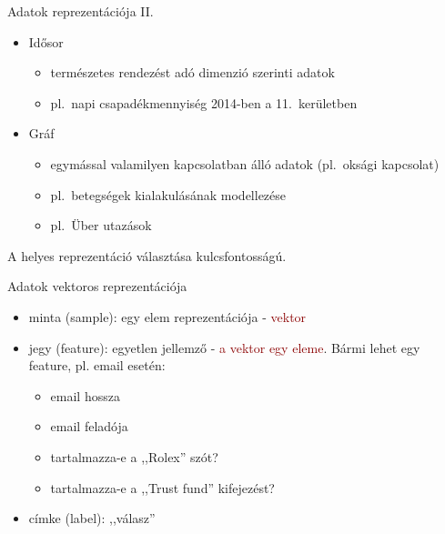 \documentclass[bigger]{beamer}
\begin{document}
\begin{frame}{Adatok reprezentációja II.}
    \begin{itemize}
        \item Idősor
            \begin{itemize}
                \item természetes rendezést adó dimenzió szerinti adatok
                \item pl.~napi csapadékmennyiség 2014-ben a 11.~kerületben
            \end{itemize}
        \item Gráf
            \begin{itemize}
                \item egymással valamilyen kapcsolatban álló adatok (pl.~oksági kapcsolat)
                \item pl.~betegségek kialakulásának modellezése
                \item pl.~Über utazások
            \end{itemize}
    \end{itemize}
    A helyes reprezentáció választása kulcsfontosságú.
\end{frame}

\begin{frame}{Adatok vektoros reprezentációja}
    \begin{itemize}
        \item minta (sample): egy elem reprezentációja - \textcolor{darkred}{vektor}
        \item jegy (feature): egyetlen jellemző - \textcolor{darkred}{a vektor egy eleme}. Bármi lehet egy feature, pl. email esetén:
	\begin{itemize}
		\item email hossza
		\item email feladója
		\item tartalmazza-e a ,,Rolex'' szót?
		\item tartalmazza-e a ,,Trust fund'' kifejezést?
	\end{itemize}
		\item címke (label): ,,válasz''

    \end{itemize}
\end{frame}
\end{document}

